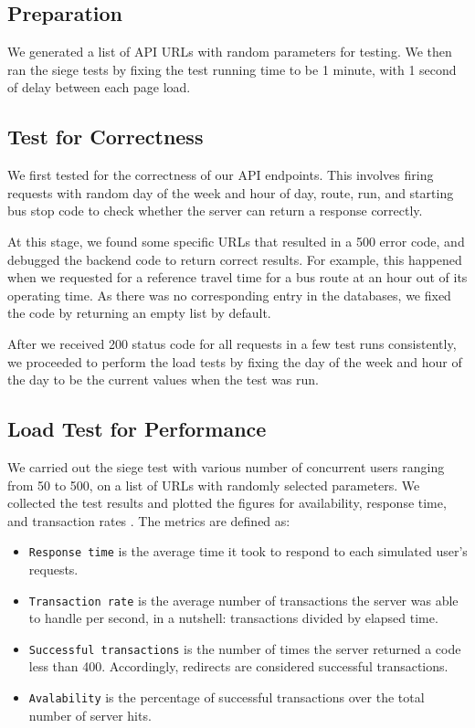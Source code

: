 \subsection{Preparation}
\par We generated a list of API URLs with random parameters for testing. We then ran the siege tests by fixing the test running time to be 1 minute, with 1 second of delay between each page load.

\subsection{Test for Correctness}
\par We first tested for the correctness of our API endpoints. This involves firing requests with random day of the week and hour of day, route, run, and starting bus stop code to check whether the server can return a response correctly.

\par At this stage, we found some specific URLs that resulted in a 500 error code, and debugged the backend code to return correct results. For example, this happened when we requested for a reference travel time for a bus route at an hour out of its operating time. As there was no corresponding entry in the databases, we fixed the code by returning an empty list by default.

\par After we received 200 status code for all requests in a few test runs consistently, we proceeded to perform the load tests by fixing the day of the week and hour of the day to be the current values when the test was run.

\subsection{Load Test for Performance}
\par We carried out the siege test with various number of concurrent users ranging from 50 to 500, on a list of URLs with randomly selected parameters. We collected the test results and plotted the figures for availability, response time, and transaction rates \cite{siege_manual}. The metrics are defined as:

\begin{itemize}
  \item \texttt{Response time} is the average time it took to respond to each simulated user’s requests.

  \item \texttt{Transaction rate} is the average number of transactions the server was able to handle per second, in a nutshell: transactions divided by elapsed time.

  \item \texttt{Successful transactions} is the number of times the server returned a code less than 400. Accordingly, redirects are considered successful transactions.

  \item \texttt{Avalability} is the percentage of successful transactions over the total number of server hits.
\end{itemize}


